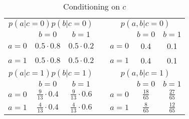 \documentclass[12pt, a4paper]{article}
\numberwithin{equation}{section}
\begin{document}
\begin{table}[t]
\centering
\begin{tabular}{ccclccc}
\multicolumn{3}{c}{$p(a|c=0)p(b|c=0)$}                                                &                       & \multicolumn{3}{c}{$p(a,b|c=0)$}                                                     \\ \cline{2-3} \cline{6-7} 
\multicolumn{1}{c|}{}       & \multicolumn{1}{c|}{$b=0$}   & \multicolumn{1}{c|}{$b=1$}   &                       & \multicolumn{1}{c|}{}      & \multicolumn{1}{c|}{$b=0$}   & \multicolumn{1}{c|}{$b=1$}   \\ \cline{1-3} \cline{5-7} 
\multicolumn{1}{|c|}{$a=0$}   & \multicolumn{1}{c|}{$0.5\cdot 0.8$}      & \multicolumn{1}{c|}{$0.5\cdot 0.2$}      & \multicolumn{1}{l|}{} & \multicolumn{1}{c|}{$a=0$}   & \multicolumn{1}{c|}{0.4}      & \multicolumn{1}{c|}{0.1}      \\ \cline{1-3} \cline{5-7} 
\multicolumn{1}{|c|}{$a=1$}   & \multicolumn{1}{c|}{$0.5\cdot 0.8$}      & \multicolumn{1}{c|}{$0.5\cdot 0.2$}      & \multicolumn{1}{l|}{} & \multicolumn{1}{c|}{$a=1$}   & \multicolumn{1}{c|}{0.4}      & \multicolumn{1}{c|}{0.1}      \\ \cline{1-3} \cline{5-7} 
\multicolumn{3}{c}{$p(a|c=1)p(b|c=1)$}                                                & \multicolumn{1}{c}{}  & \multicolumn{3}{c}{$p(a,b|c=1)$}                                                     \\ \cline{2-3} \cline{6-7} 
\multicolumn{1}{c|}{}       & \multicolumn{1}{c|}{$b=0$} & \multicolumn{1}{c|}{$b=1$} & \multicolumn{1}{c}{}  & \multicolumn{1}{c|}{}      & \multicolumn{1}{c|}{$b=0$} & \multicolumn{1}{c|}{$b=1$} \\ \cline{1-3} \cline{5-7} 
\multicolumn{1}{|c|}{$a=0$} & \multicolumn{1}{c|}{$\frac{9}{13}\cdot 0.4$}      & \multicolumn{1}{c|}{$\frac{9}{13}\cdot 0.6$}      & \multicolumn{1}{c|}{} & \multicolumn{1}{c|}{$a=0$} & \multicolumn{1}{c|}{$\frac{18}{65}$}      & \multicolumn{1}{c|}{$\frac{27}{65}$}      \\ \cline{1-3} \cline{5-7} 
\multicolumn{1}{|c|}{$a=1$} & \multicolumn{1}{c|}{$\frac{4}{13}\cdot 0.4$}      & \multicolumn{1}{c|}{$\frac{4}{13}\cdot 0.6$}      & \multicolumn{1}{c|}{} & \multicolumn{1}{c|}{$a=1$} & \multicolumn{1}{c|}{$\frac{8}{65}$}      & \multicolumn{1}{c|}{$\frac{12}{65}$}      \\ \cline{1-3} \cline{5-7} 
\end{tabular}
\caption{Conditioning on $c$}
\label{table:e_83_conditional}
\end{table}
\end{document}
